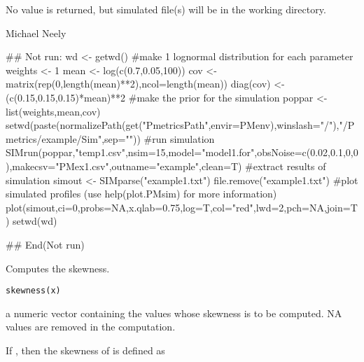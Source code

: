 \documentclass[a4paper]{book}
\begin{document}
%
\begin{Value}
No value is returned, but simulated file(s) will be in the working directory.
\end{Value}
%
\begin{Author}\relax
Michael Neely
\end{Author}
%
\begin{SeeAlso}\relax
{}
\end{SeeAlso}
%
\begin{Examples}
\begin{ExampleCode}
## Not run: 
wd <- getwd()
#make 1 lognormal distribution for each parameter
weights <- 1
mean <- log(c(0.7,0.05,100))
cov <- matrix(rep(0,length(mean)**2),ncol=length(mean))
diag(cov) <- (c(0.15,0.15,0.15)*mean)**2
#make the prior for the simulation
poppar <- list(weights,mean,cov)
setwd(paste(normalizePath(get("PmetricsPath",envir=PMenv),winslash="/"),"/Pmetrics/example/Sim",sep=""))
#run simulation
SIMrun(poppar,"temp1.csv",nsim=15,model="model1.for",obsNoise=c(0.02,0.1,0,0),makecsv="PMex1.csv",outname="example",clean=T)
#extract results of simulation
simout <- SIMparse("example1.txt")
file.remove("example1.txt")
#plot simulated profiles (use help(plot.PMsim) for more information)
plot(simout,ci=0,probs=NA,x.qlab=0.75,log=T,col="red",lwd=2,pch=NA,join=T)
setwd(wd)

## End(Not run)
\end{ExampleCode}
\end{Examples}
%
\begin{Description}\relax
Computes the skewness.
\end{Description}
%
\begin{Usage}
\begin{verbatim}
skewness(x)
\end{verbatim}
\end{Usage}
%
\begin{Arguments}
\begin{ldescription}
\item[\code{x}] a numeric vector containing the values whose skewness is to be
computed. NA values are removed in the computation.
\end{ldescription}
\end{Arguments}
%
\begin{Details}\relax
If , then the skewness of 
is defined as 
\end{Details}
\end{document}
